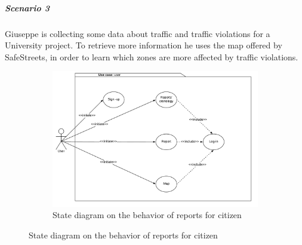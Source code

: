 \documentclass[12pt,a4paper]{report}
\begin{document}
				\subparagraph{Scenario 3}
					Giuseppe is collecting some data about traffic and traffic violations for a University project. To retrieve more
					information he uses the map offered by SafeStreets, in order to learn which zones are more affected by traffic violations.
					
				\begin{figure}[H]
					\begin{subfigure}{\textwidth}
						\includegraphics[scale = 0.75, center]{UseCaseC}
						\caption{State diagram on the behavior of reports for citizen}
					\end{subfigure}
				\end{figure}
\end{document}

